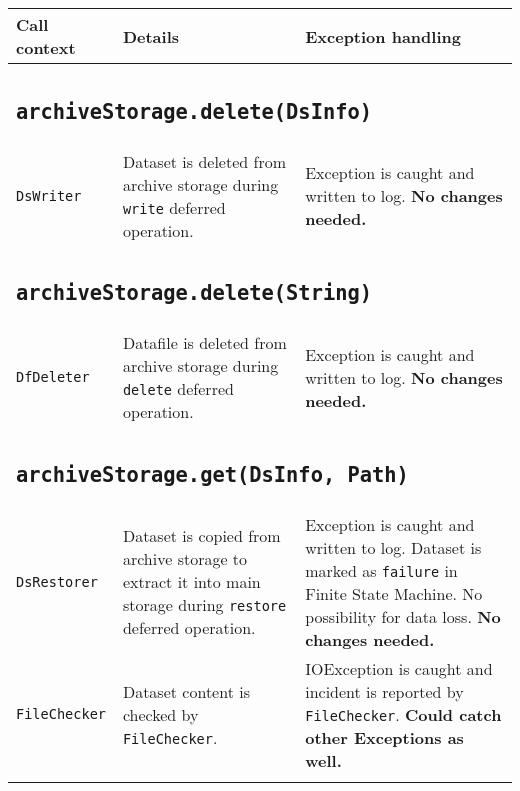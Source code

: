 \documentclass[paper=a4]{scrartcl}
\begin{document}
\begin{longtable}{ p{32mm} | p{48mm} | p{48mm} }

    Call context & Details & Exception handling \\
    \hline \hline

    \multicolumn{3}{p{\textwidth}}{
      \subsection{\texttt{archiveStorage.delete(DsInfo)}}
    } \\

    \raggedright \texttt{DsWriter} &
    \raggedright Dataset is deleted from archive storage during \texttt{write} deferred operation. &
    \raggedright Exception is caught and written to log. \textbf{No changes needed.}
    \tabularnewline

    \multicolumn{3}{p{\textwidth}}{
      \subsection{\texttt{archiveStorage.delete(String)}}
    } \\

    \raggedright \texttt{DfDeleter} &
    \raggedright Datafile is deleted from archive storage during \texttt{delete} deferred operation. &
    \raggedright Exception is caught and written to log. \textbf{No changes needed.}
    \tabularnewline

    \multicolumn{3}{p{\textwidth}}{
      \subsection{\texttt{archiveStorage.get(DsInfo, Path)}}
    } \\

    \raggedright \texttt{DsRestorer} &
    \raggedright Dataset is copied from archive storage to extract it into main storage during \texttt{restore} deferred operation. &
    \raggedright Exception is caught and written to log. Dataset is marked as \texttt{failure} in Finite State Machine. No possibility for data loss. \textbf{No changes needed.}
    \tabularnewline[4mm]
    \raggedright \texttt{FileChecker} &
    \raggedright Dataset content is checked by \texttt{FileChecker}. &
    \raggedright IOException is caught and incident is reported by \texttt{FileChecker}. \textbf{Could catch other Exceptions as well.}
    \tabularnewline

    \multicolumn{3}{p{\textwidth}}{
}
\end{longtable}
\end{document}
